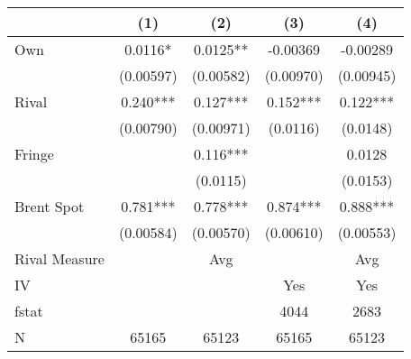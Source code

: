 {
\def\sym#1{\ifmmode^{#1}\else\(^{#1}\)\fi}
\begin{tabular}{l*{4}{c}}
\toprule
                &\multicolumn{1}{c}{(1)}   &\multicolumn{1}{c}{(2)}   &\multicolumn{1}{c}{(3)}   &\multicolumn{1}{c}{(4)}   \\
\midrule
Own             &   0.0116*  &   0.0125** & -0.00369   & -0.00289   \\
                &(0.00597)   &(0.00582)   &(0.00970)   &(0.00945)   \\
\addlinespace
Rival           &    0.240***&    0.127***&    0.152***&    0.122***\\
                &(0.00790)   &(0.00971)   & (0.0116)   & (0.0148)   \\
\addlinespace
Fringe          &            &    0.116***&            &   0.0128   \\
                &            & (0.0115)   &            & (0.0153)   \\
\addlinespace
Brent Spot      &    0.781***&    0.778***&    0.874***&    0.888***\\
                &(0.00584)   &(0.00570)   &(0.00610)   &(0.00553)   \\
\midrule
Rival Measure   &            &      Avg   &            &      Avg   \\
IV              &            &            &      Yes   &      Yes   \\
fstat           &            &            &     4044   &     2683   \\
N               &    65165   &    65123   &    65165   &    65123   \\
\bottomrule
\end{tabular}
}
